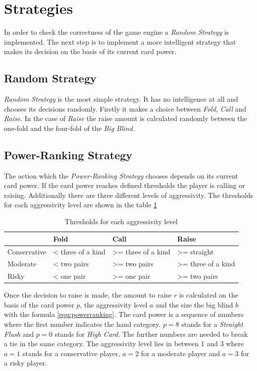 \section{Strategies}
\label{sec:strategies}
In order to check the correctness of the game engine a \emph{Random Strategy} is implemented. The next step is to implement a more intelligent strategy that makes its decision on the basis of its current card power.

\subsection{Random Strategy}
\emph{Random Strategy} is the most simple strategy. It has no intelligence at all and chooses its decisions randomly. Firstly it makes a choice between \emph{Fold}, \emph{Call} and \emph{Raise}. In the case of \emph{Raise} the raise amount is calculated randomly between the one-fold and the four-fold of the \emph{Big Blind}.

\subsection{Power-Ranking Strategy}
The action which the \emph{Power-Ranking Strategy} chooses depends on its current card power. If the card power reaches defined thresholds the player is calling or raising. Additionally there are three different levels of aggressivity. The thresholds for each aggressivity level are shown in the table \ref{tbl:powerRankingAggros}

\begin{table}[h]
	\centering
	\begin{tabular}[h]{l|l|l|l}
		 & \textbf{Fold} & \textbf{Call} & \textbf{Raise}\\
		\hline
		Conservative & < three of a kind & >= three of a kind & >= straight\\
		Moderate & < two pairs & >= two pairs & >= three of a kind\\
		Risky & < one pair & >= one pair & >= two pairs\\
	\end{tabular}
	\caption{Thresholds for each aggressivity level}
	\label{tbl:powerRankingAggros}
\end{table}

Once the decision to raise is made, the amount to raise $r$ is calculated on the basis of the card power $p$, the aggressivity level $a$ and the size the big blind $b$ with the formula \ref{equ:powerranking}. The card power is a sequence of numbers where the first number indicates the hand category. $p = 8$ stands for a \emph{Straight Flush} and $p = 0$ stands for \emph{High Card}. The further numbers are needed to break a tie in the same category. The aggressivity level lies in between 1 and 3 where $a = 1$ stands for a conservative player, $a = 2$ for a moderate player and $a = 3$ for a risky player.

